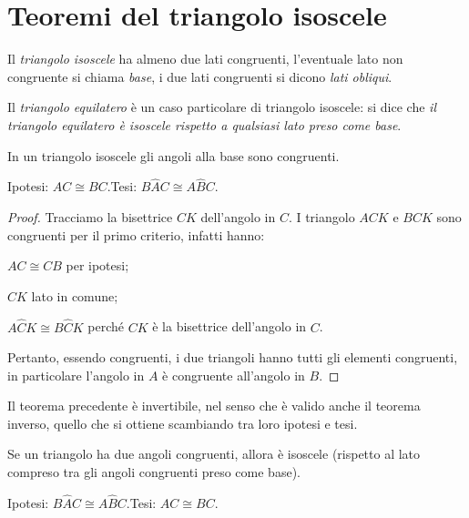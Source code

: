 \section{Teoremi del triangolo isoscele}

Il \emph{triangolo isoscele} ha almeno due lati congruenti, l'eventuale lato non congruente si chiama \emph{base}, i due lati congruenti si dicono \emph{lati obliqui}.

Il \emph{triangolo equilatero} è un caso particolare di triangolo isoscele: si dice che \emph{il triangolo equilatero è isoscele rispetto a qualsiasi lato preso come base}.

\begin{teorema}
In un triangolo isoscele gli angoli alla base sono congruenti.
\end{teorema}

\noindent Ipotesi: $AC\cong BC$.\tab Tesi: $B\widehat{A}C\cong A\widehat{B}C$.

\begin{proof}
Tracciamo la bisettrice $CK$ dell'angolo in $C$.
I triangolo $ACK$ e $BCK$ sono congruenti per il primo criterio, infatti hanno:
\begin{itemize*}
\item $AC\cong CB$ per ipotesi;
\item $CK$ lato in comune;
\item $A\widehat{C}K\cong B\widehat{C}K$ perché $CK$ è la bisettrice dell'angolo in $C$.
\end{itemize*}
Pertanto, essendo congruenti, i due triangoli hanno tutti gli elementi congruenti, in particolare l'angolo in $A$ è congruente all'angolo in $B$.
\end{proof}

Il teorema precedente è invertibile, nel senso che è valido anche il teorema inverso, quello che si ottiene scambiando tra loro ipotesi e tesi.

\begin{teorema}
Se un triangolo ha due angoli congruenti, allora è isoscele (rispetto al lato compreso tra gli angoli congruenti preso come base).
\end{teorema}

\noindent Ipotesi: $B\widehat{A}C\cong A\widehat{B}C$.\tab Tesi: $AC\cong BC$.


